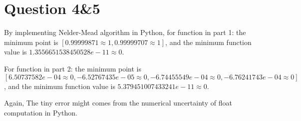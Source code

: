 \documentclass[a4paper,12pt]{article} %
\begin{document}
\section*{\textbf{Question 4\&5}}
By implementing Nelder-Mead algorithm in Python, for function in part 1: the minimum point is $[0.99999871\approx 1, 0.99999707\approx 1]$, and the
minimum function value is $1.3556651538450528e-11 \approx 0 $.

For function in part 2: the minimum point is $[ 6.50737582e-04\approx 0, -6.52767435e-05\approx 0, -6.74455549e-04\approx 0, -6.76241743e-04\approx 0]$, and the
minimum function value is $5.379451007433241e-11 \approx 0 $.

Again, The tiny error might comes from the numerical uncertainty of float computation in Python.
\end{document}
